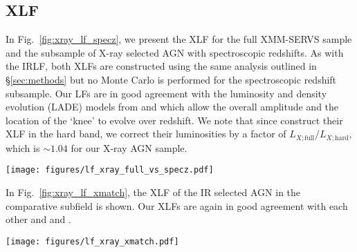 \documentclass[twocolumn, trackchanges]{aastex63}
\begin{document}
\subsection{XLF}
In Fig.~\ref{fig:xray_lf_specz}, we present the XLF for the full XMM-SERVS sample and the subsample of X-ray selected AGN with spectroscopic redshifts.
As with the IRLF, both XLFs are constructed using the same analysis outlined in \S\ref{sec:methods} but no Monte Carlo is performed for the spectroscopic redshift subsample.
Our LFs are in good agreement with the luminosity and density evolution (LADE) models from \cite{ranalli_210_2016} and \cite{aird_evolution_2010} which allow the overall amplitude and the location of the `knee' to evolve over redshift.
We note that since \cite{aird_evolution_2010} construct their XLF in the hard band, we correct their luminosities by a factor of $L_{X;\mathrm{full}}/L_{X;\mathrm{hard}}$, which is $\sim 1.04$ for our X-ray AGN sample.

\begin{figure*}[hptb]
\centering
\texttt{[image: figures/lf\_xray\_full\_vs\_specz.pdf]}
\caption{XLF constructed using the XMM-SERVS catalog with uncertainties estimated by MC of N=10000. The XLF constructed using only spectroscopic redshifts is also shown. Also shown are the LADE evolution models of \cite{ranalli_210_2016, aird_evolution_2010}. The 68\% confidence intervals are hatched. The darker colored regions are where the models are supported by the data and lighter colored regions are where their models are extrapolated. In the higher redshift bin, our sample reaches higher luminosities than \cite{ranalli_210_2016} and \cite{aird_evolution_2010}. Our results are in good agreement with their models. In particular, our LF is in almost entirely within the confidence bands of the \cite{ranalli_210_2016} model.}
\label{fig:xray_lf_specz}
\end{figure*}

In Fig.~\ref{fig:xray_lf_xmatch}, the XLF of the IR selected AGN in the comparative subfield is shown.
Our XLFs are again in good agreement with each other and \cite{ranalli_210_2016} and \cite{aird_evolution_2010}.

\begin{figure*}[hptb]
\centering
\texttt{[image: figures/lf\_xray\_xmatch.pdf]}
\caption{XLF as shown in Fig.~\ref{fig:xray_lf_specz}. Additionally, we plot the LF constructed using the comparative sample of IR selected AGN.}
\label{fig:xray_lf_xmatch}
\end{figure*}
\end{document}

